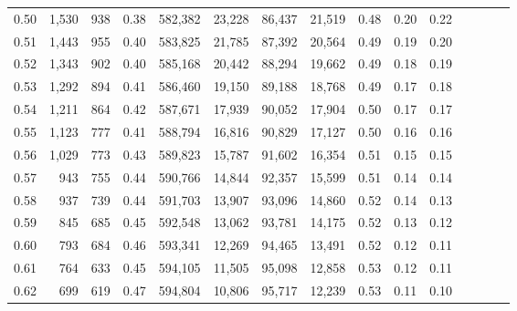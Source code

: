 \begin{tabular}{rrrcrrrrrrrrrrr}
0.50 &   1,530 &    938 &                                       0.38 &  582,382 &   23,228 &   86,437 &   21,519 &  0.48 &  0.20 &                         0.22 \\
0.51 &   1,443 &    955 &                                       0.40 &  583,825 &   21,785 &   87,392 &   20,564 &  0.49 &  0.19 &                         0.20 \\
0.52 &   1,343 &    902 &                                       0.40 &  585,168 &   20,442 &   88,294 &   19,662 &  0.49 &  0.18 &                         0.19 \\
0.53 &   1,292 &    894 &                                       0.41 &  586,460 &   19,150 &   89,188 &   18,768 &  0.49 &  0.17 &                         0.18 \\
0.54 &   1,211 &    864 &                                       0.42 &  587,671 &   17,939 &   90,052 &   17,904 &  0.50 &  0.17 &                         0.17 \\
0.55 &   1,123 &    777 &                                       0.41 &  588,794 &   16,816 &   90,829 &   17,127 &  0.50 &  0.16 &                         0.16 \\
0.56 &   1,029 &    773 &                                       0.43 &  589,823 &   15,787 &   91,602 &   16,354 &  0.51 &  0.15 &                         0.15 \\
0.57 &     943 &    755 &                                       0.44 &  590,766 &   14,844 &   92,357 &   15,599 &  0.51 &  0.14 &                         0.14 \\
0.58 &     937 &    739 &                                       0.44 &  591,703 &   13,907 &   93,096 &   14,860 &  0.52 &  0.14 &                         0.13 \\
0.59 &     845 &    685 &                                       0.45 &  592,548 &   13,062 &   93,781 &   14,175 &  0.52 &  0.13 &                         0.12 \\
0.60 &     793 &    684 &                                       0.46 &  593,341 &   12,269 &   94,465 &   13,491 &  0.52 &  0.12 &                         0.11 \\
0.61 &     764 &    633 &                                       0.45 &  594,105 &   11,505 &   95,098 &   12,858 &  0.53 &  0.12 &                         0.11 \\
0.62 &     699 &    619 &                                       0.47 &  594,804 &   10,806 &   95,717 &   12,239 &  0.53 &  0.11 &                         0.10 \\

\end{tabular}
